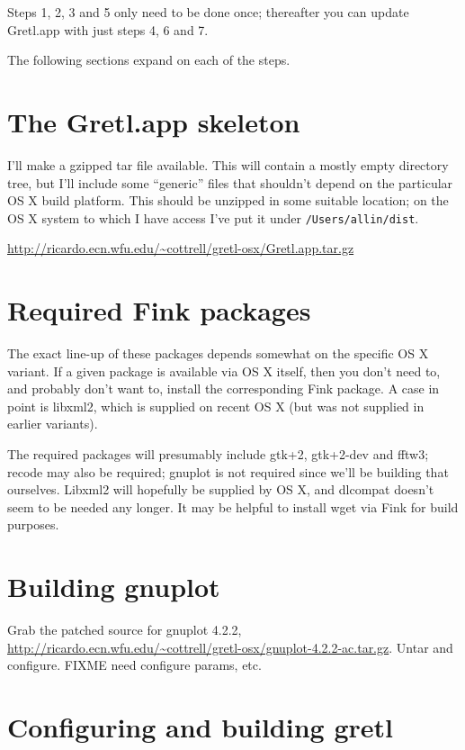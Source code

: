 \documentclass{article}
\begin{document}
Steps 1, 2, 3 and 5 only need to be done once; thereafter you can
update Gretl.app with just steps 4, 6 and 7.

The following sections expand on each of the steps.

\section{The Gretl.app skeleton}

I'll make a gzipped tar file available.  This will contain a mostly
empty directory tree, but I'll include some ``generic'' files that
shouldn't depend on the particular OS X build platform.  This should
be unzipped in some suitable location; on the OS X system to which I
have access I've put it under \texttt{/Users/allin/dist}.

\url{http://ricardo.ecn.wfu.edu/~cottrell/gretl-osx/Gretl.app.tar.gz}

\section{Required Fink packages}

The exact line-up of these packages depends somewhat on the specific
OS X variant.  If a given package is available via OS X itself, then
you don't need to, and probably don't want to, install the
corresponding Fink package.  A case in point is libxml2, which is
supplied on recent OS X (but was not supplied in earlier variants).

The required packages will presumably include gtk+2, gtk+2-dev and
fftw3; recode may also be required; gnuplot is not required since
we'll be building that ourselves.  Libxml2 will hopefully be supplied
by OS X, and dlcompat doesn't seem to be needed any longer. It may be
helpful to install wget via Fink for build purposes.

\section{Building gnuplot}

Grab the patched source for gnuplot 4.2.2,
\url{http://ricardo.ecn.wfu.edu/~cottrell/gretl-osx/gnuplot-4.2.2-ac.tar.gz}.
Untar and configure.  FIXME need configure params, etc.


\section{Configuring and building gretl}
\end{document}
